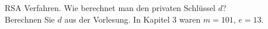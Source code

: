 \begin{aufgabe}[{Klausurvorbereitung 7}]
RSA Verfahren. Wie berechnet man den privaten Schlüssel $d$?\\
Berechnen Sie $d$ aus der Vorlesung. In Kapitel 3 waren $m = 101$, $e = 13$.
\end{aufgabe}

